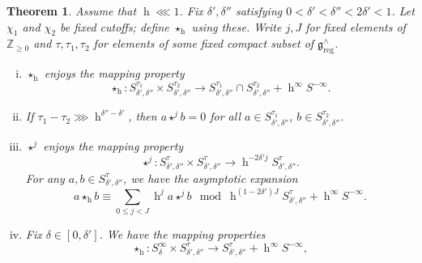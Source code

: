 \documentclass[reqno]{amsart}
\DeclareMathOperator{\h}{h}
\DeclareMathOperator{\reg}{reg}
\theoremstyle{plain} \newtheorem{theorem} {Theorem}
\theoremstyle{definition} \newtheorem{definition} [theorem] {Definition}
\theoremstyle{itplain} %
\numberwithin{equation}{section}
\numberwithin{theorem}{section}
\renewcommand{\geq}{\geqslant}
\renewcommand{\leq}{\leqslant}
\begin{document}
\begin{theorem}\label{thm:refined-star-prod}
  Assume that $\h \lll 1$.  Fix $\delta ', \delta ''$ satisfying $0 < \delta ' < \delta '' < 2 \delta ' < 1$.  Let $\chi_1$ and $\chi_2$ be fixed cutoffs; define $\star_{\h}$ using these.  Write $j, J$ for fixed elements of $\mathbb{Z}_{\geq 0}$ and $\tau, \tau_1, \tau_2$ for
  elements of some fixed compact subset of $\mathfrak{g}^\wedge_{\reg}$.
  \begin{enumerate}[(i)]
  \item \label{item:star-prod-1} $\star_{\h}$ enjoys the mapping property
    \begin{equation}\label{eqn:star-h-new-mapping-property-super-localized}
      \star_{\h} :
      S^{\tau_1}_{\delta', \delta''} 
      \times 
      S^{\tau_2}_{\delta', \delta''} 
      \rightarrow
      S^{\tau_1}_{\delta', \delta ''}
      \cap S^{\tau_2}_{\delta', \delta ''}
      + \h^{\infty} S^{-\infty}.
    \end{equation}
  \item \label{item:star-prod-2} If $\tau_1 - \tau_2 \ggg \h^{\delta '' - \delta '}$, then $a \star^j b = 0$ for all $a \in S^{\tau_1}_{\delta',\delta''}$, $b \in S^{\tau_2}_{\delta ', \delta ''}$.
  \item \label{item:star-prod-3} $\star^j$ enjoys the mapping property
    \begin{equation}\label{eqn:star-j-new-mapping-property}
      \star^j :
      S_{\delta ', \delta ''}^{\tau }
      \times 
      S_{\delta ', \delta ''}^{\tau }
      \rightarrow \h^{- 2 \delta' j} 
      S^{\tau}_{\delta', \delta ''}.
    \end{equation}
    For any $a,b \in S_{\delta ', \delta ''}^\tau$, we have the asymptotic expansion
    \begin{equation}\label{eqn:star-j-asymp-expn-new}
      a \star_{\h} b
      \equiv  \sum _{0 \leq j < J}
      \h^j a \star^j b
      \mod{
        \h^{(1- 2 \delta') J} S^{\tau}_{\delta', \delta''}
        +
        \h^{\infty}
        S^{-\infty}}.
    \end{equation}
  \item \label{item:star-prod-4} Fix $\delta \in [0,\delta']$.  We have the mapping properties
    \begin{equation*}
      \star_{\h} : S^{\infty}_{\delta} \times S^{\tau}_{ \delta
        ', \delta ''}
      \rightarrow S^{\tau}_{ \delta ', \delta ''}
      + \h^\infty S^{-\infty},
    \end{equation*}

\end{enumerate}
\end{theorem}
\end{document}
